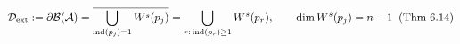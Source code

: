 \documentclass[preview]{standalone}
\begin{document}
\begin{align*}
\special{dvisvgm:raw <g id='unique000'>}\mathcal{D}_{\text{ext}} := \partial\mathcal{B}(\mathcal{A}) = \overline{\bigcup_{\operatorname{ind}(p_j)=1} W^s(p_j)} = \bigcup_{r:\,\operatorname{ind}(p_r)\ge 1} W^s(p_r), \qquad \dim W^s(p_j) = n - 1\;\;(\text{Thm 6.14})\special{dvisvgm:raw </g>}
\end{align*}
\end{document}
